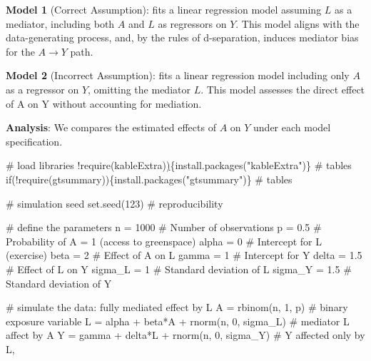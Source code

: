\documentclass[
  singlecolumn]{article}
\newenvironment{Shaded}{}{}
\newcommand{\CommentTok}[1]{\textcolor[rgb]{0.42,0.45,0.49}{#1}}
\newcommand{\ControlFlowTok}[1]{\textcolor[rgb]{0.84,0.23,0.29}{#1}}
\newcommand{\DecValTok}[1]{\textcolor[rgb]{0.00,0.36,0.77}{#1}}
\newcommand{\ErrorTok}[1]{\textcolor[rgb]{1.00,0.33,0.33}{\underline{#1}}}
\newcommand{\FloatTok}[1]{\textcolor[rgb]{0.00,0.36,0.77}{#1}}
\newcommand{\FunctionTok}[1]{\textcolor[rgb]{0.44,0.26,0.76}{#1}}
\newcommand{\NormalTok}[1]{\textcolor[rgb]{0.14,0.16,0.18}{#1}}
\newcommand{\OtherTok}[1]{\textcolor[rgb]{0.44,0.26,0.76}{#1}}
\newcommand{\SpecialCharTok}[1]{\textcolor[rgb]{0.00,0.36,0.77}{#1}}
\newcommand{\StringTok}[1]{\textcolor[rgb]{0.01,0.18,0.38}{#1}}
\begin{document}
\textbf{Model 1} (Correct Assumption): fits a linear regression model
assuming \(L\) as a mediator, including both \(A\) and \(L\) as
regressors on \(Y\). This model aligns with the data-generating process,
and, by the rules of d-separation, induces mediator bias for the
\(A\to Y\) path.

\textbf{Model 2} (Incorrect Assumption): fits a linear regression model
including only \(A\) as a regressor on \(Y\), omitting the mediator
\(L\). This model assesses the direct effect of A on Y without
accounting for mediation.

\textbf{Analysis}: We compares the estimated effects of \(A\) on \(Y\)
under each model specification.

\begin{Shaded}
\begin{Highlighting}[]
\CommentTok{\# load libraries}
\SpecialCharTok{!}\FunctionTok{require}\NormalTok{(kableExtra)}\ErrorTok{)}\NormalTok{\{}\FunctionTok{install.packages}\NormalTok{(}\StringTok{"kableExtra"}\NormalTok{)\} }\CommentTok{\# tables}
\ControlFlowTok{if}\NormalTok{(}\SpecialCharTok{!}\FunctionTok{require}\NormalTok{(gtsummary))\{}\FunctionTok{install.packages}\NormalTok{(}\StringTok{"gtsummary"}\NormalTok{)\} }\CommentTok{\# tables}

\CommentTok{\# simulation seed}
\FunctionTok{set.seed}\NormalTok{(}\DecValTok{123}\NormalTok{) }\CommentTok{\#  reproducibility}

\CommentTok{\# define the parameters }
\NormalTok{n }\OtherTok{=} \DecValTok{1000} \CommentTok{\# Number of observations}
\NormalTok{p }\OtherTok{=} \FloatTok{0.5}  \CommentTok{\# Probability of A = 1 (access to greenspace)}
\NormalTok{alpha }\OtherTok{=} \DecValTok{0} \CommentTok{\# Intercept for L (exercise)}
\NormalTok{beta }\OtherTok{=} \DecValTok{2}  \CommentTok{\# Effect of A on L }
\NormalTok{gamma }\OtherTok{=} \DecValTok{1} \CommentTok{\# Intercept for Y }
\NormalTok{delta }\OtherTok{=} \FloatTok{1.5} \CommentTok{\# Effect of L on Y}
\NormalTok{sigma\_L }\OtherTok{=} \DecValTok{1} \CommentTok{\# Standard deviation of L}
\NormalTok{sigma\_Y }\OtherTok{=} \FloatTok{1.5} \CommentTok{\# Standard deviation of Y}

\CommentTok{\# simulate the data: fully mediated effect by L}
\NormalTok{A }\OtherTok{=} \FunctionTok{rbinom}\NormalTok{(n, }\DecValTok{1}\NormalTok{, p) }\CommentTok{\# binary exposure variable}
\NormalTok{L }\OtherTok{=}\NormalTok{ alpha }\SpecialCharTok{+}\NormalTok{ beta}\SpecialCharTok{*}\NormalTok{A }\SpecialCharTok{+} \FunctionTok{rnorm}\NormalTok{(n, }\DecValTok{0}\NormalTok{, sigma\_L) }\CommentTok{\# mediator L affect by A}
\NormalTok{Y }\OtherTok{=}\NormalTok{ gamma }\SpecialCharTok{+}\NormalTok{ delta}\SpecialCharTok{*}\NormalTok{L }\SpecialCharTok{+} \FunctionTok{rnorm}\NormalTok{(n, }\DecValTok{0}\NormalTok{, sigma\_Y) }\CommentTok{\# Y affected only by L,}


\end{Highlighting}
\end{Shaded}
\end{document}
